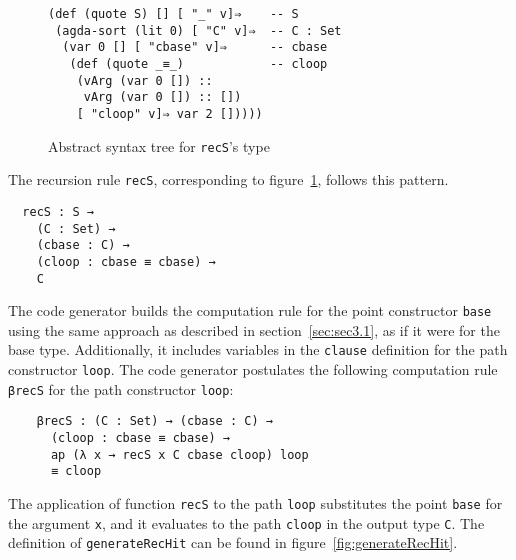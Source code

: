 \documentclass[sigplan,10pt]{acmart}
\begin{document}
\begin{figure}
\begin{center}
\begingroup
\begin{Verbatim}
(def (quote S) [] [ "_" v]⇒    -- S
 (agda-sort (lit 0) [ "C" v]⇒  -- C : Set
  (var 0 [] [ "cbase" v]⇒      -- cbase
   (def (quote _≡_)            -- cloop
    (vArg (var 0 []) ::
     vArg (var 0 []) :: [])
    [ "cloop" v]⇒ var 2 []))))
\end{Verbatim}
\endgroup
\end{center}
\caption{Abstract syntax tree for {\tt recS}'s type}
\label{fig:ast-f}
\end{figure}
\normalsize

The recursion rule {\tt recS}, corresponding to figure~\ref{fig:ast-f}, follows this pattern.
\begin{center}
\begingroup
\begin{BVerbatim}
  recS : S → 
    (C : Set) →
    (cbase : C) →
    (cloop : cbase ≡ cbase) →
    C
\end{BVerbatim}
\endgroup
\end{center}

The code generator builds the computation rule for the point constructor {\tt base} using the same approach as described in section~\ref{sec:sec3.1}, as if it were for the base type.
Additionally, it includes variables in the {\tt clause} definition for the path constructor {\tt loop}.
The code generator postulates the following computation rule {\tt βrecS} for the path constructor {\tt loop}:

\begin{center}
\begingroup
\begin{BVerbatim}
    βrecS : (C : Set) → (cbase : C) → 
      (cloop : cbase ≡ cbase) → 
      ap (λ x → recS x C cbase cloop) loop 
      ≡ cloop
\end{BVerbatim}
\endgroup
\end{center}

The application of function {\tt recS} to the path {\tt loop} substitutes the point {\tt base} for the argument {\tt x}, and it evaluates to the path {\tt cloop} in the output type {\tt C}. The definition of {\tt generateRecHit} can be found in figure~\ref{fig:generateRecHit}.

\end{document}
